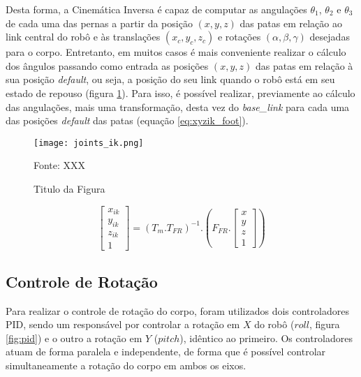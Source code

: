 \documentclass[../main.tex]{subfiles}
\begin{document}
  Desta forma, a Cinemática Inversa é capaz de computar as angulações  $\theta_1$, $\theta_2$ e $\theta_3$ de cada uma das pernas a partir da posição $(x, y, z)$ das patas em relação ao link central do robô e às translações $(x_c, y_c, z_c)$ e rotações $(\alpha, \beta, \gamma)$ desejadas para o corpo. Entretanto, em muitos casos é mais conveniente realizar o cálculo dos ângulos passando como entrada as posições $(x, y, z)$ das patas em relação à sua posição \textit{default}, ou seja, a posição do seu link quando o robô está em seu estado de repouso (figura \ref{fig:joints_ik}). Para isso, é possível realizar, previamente ao cálculo das angulações, mais uma transformação, desta vez do \textit{base\_link} para cada uma das posições \textit{default} das patas (equação \ref{eq:xyzik_foot}).

  \begin{figure}[h]
    \centering
    \caption{Titulo da Figura}
    \texttt{[image: joints\_ik.png]}
    
    Fonte: XXX
    \label{fig:joints_ik}
  \end{figure}


  \begin{equation}
    \label{eq:xyzik_foot}
    \begin{bmatrix}
    x_{ik} \\
    y_{ik} \\
    z_{ik} \\
    1
    \end{bmatrix}= (T_m.T_{FR})^{-1}.
    (F_{FR}.
    \begin{bmatrix}
    x \\
    y \\
    z \\
    1
    \end{bmatrix})
  \end{equation}

  \subsection{Controle de Rotação}

  Para realizar o controle de rotação do corpo, foram utilizados dois controladores PID, sendo um responsável por controlar a rotação em $X$ do robô ($roll$, figura \ref{fig:pid}) e o outro a rotação em $Y$ ($pitch$), idêntico ao primeiro. Os controladores atuam de forma paralela e independente, de forma que é possível controlar simultaneamente a rotação do corpo em ambos os eixos.
\end{document}
